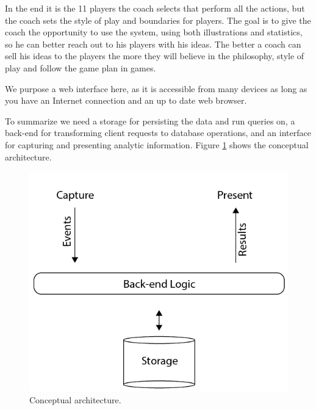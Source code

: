 In the end it is the 11 players the coach selects that perform all the actions, but the coach sets the style of play and boundaries for players. The goal is to give the coach the opportunity to use the system, using both illustrations and statistics, so he can better reach out to his players with his ideas. The better a coach can sell his ideas to the players the more they will believe in the philosophy, style of play and follow the game plan in games.

We purpose a web interface here, as it is accessible from many devices as long as you have an Internet connection and an up to date web browser. 


To summarize we need a storage for persisting the data and run queries on, a back-end for transforming client requests to database operations, and an interface for capturing and presenting analytic information. Figure \ref{fig:conept_arch} shows the conceptual architecture. 

\begin{figure}[ht!]
\centering
\includegraphics[width=150mm]{images/architecture/conceptual_architecture.png}
\caption{Conceptual architecture.}
\label{fig:conept_arch}
\end{figure}



